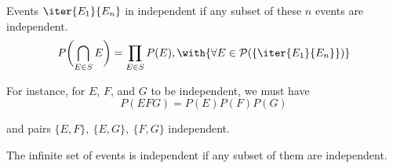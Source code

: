 \label{c15b12c}

Events $\iter{E_1}{E_n}$ in independent if any subset of these $n$ events are
independent.
$$
  P\biggl(\bigcap_{E\in S}E \biggr)=\prod_{E\in S}P(E),\with{\forall E\in\mathcal P(\{\iter{E_1}{E_n}\})}
$$

For instance, for $E$, $F$, and $G$ to be independent, we must have
$$
  P(EFG)=P(E)P(F)P(G)
$$

and pairs $\{E,F\},\ \{E,G\},\ \{F,G\}$ independent.

\label{fa07197}

The infinite set of events is independent if any subset of them are
independent.
